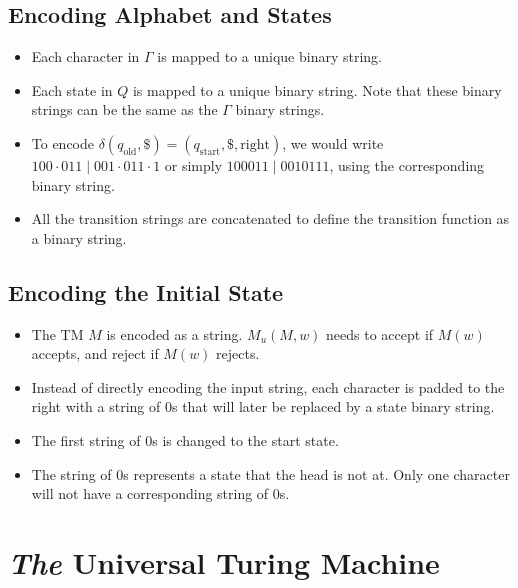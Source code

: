 \subsection{Encoding Alphabet and States}
\begin{itemize}
    \item Each character in $\Gamma$ is mapped to a unique binary string.
    \item Each state in $Q$ is mapped to a unique binary string. Note that these binary strings can be the same as the $\Gamma$ binary strings.
    \item To encode $\delta(q_\text{old}, \$) = (q_\text{start}, \$, \text{right})$, we would write $100 \cdot 011 \mid 001 \cdot 011 \cdot 1$ or simply $100011 \mid 0010111$, using the corresponding binary string.
    \item All the transition strings are concatenated to define the transition function as a binary string.
\end{itemize}

\subsection{Encoding the Initial State}
\begin{itemize}
    \item The TM $M$ is encoded as a string. $M_u(M, w)$ needs to accept if $M(w)$ accepts, and reject if $M(w)$ rejects.
    \item Instead of directly encoding the input string, each character is padded to the right with a string of $0$s that will later be replaced by a state binary string.
    \item The first string of $0$s is changed to the start state.
    \item The string of $0$s represents a state that the head is not at. Only one character will not have a corresponding string of $0$s.
\end{itemize}

\section{\textit{The} Universal Turing Machine}

